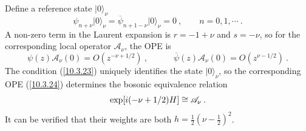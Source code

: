 	Define a reference state $\lvert 0\rangle_{\nu}$
	\begin{equation}
		\psi_{n+\nu}\lvert 0\rangle_{\nu} = \overline{\psi}_{n+1-\nu}\lvert 0\rangle_{\nu}=0\:,\qquad
		n=0,1,\cdots\:. \label{10.3.23}
	\end{equation}
	A non-zero term in the Laurent expansion is $r=-1+\nu$ and $s=-\nu$, so for the corresponding local operator $\mathscr{A}_{\nu}$, the OPE is
	\begin{equation}
		\psi(z)\mathscr{A}_{\nu}(0)=O(z^{-\nu+1/2})\:, \qquad  \quad
		\overline{\psi}(z)\mathscr{A}_{\nu}(0) = O(z^{\nu-1/2})\:. \label{10.3.24}
	\end{equation}
	The condition (\ref{10.3.23}) uniquely identifies the state $\lvert 0\rangle_{\nu}$, so the corresponding OPE (\ref{10.3.24}) determines the bosonic equivalence relation
	\begin{equation}
		\exp[i(-\nu+1/2)H]\cong \mathscr{A}_{\nu} \:. \label{10.3.25}
	\end{equation}
	It can be verified that their weights are both $h=\tfrac{1}{2}(\nu-\tfrac{1}{2})^{2}$.
